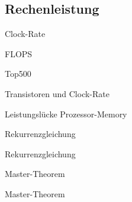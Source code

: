 \subsection{Rechenleistung}

\begin{defi}{Clock-Rate}

\end{defi}

\begin{defi}{FLOPS}

\end{defi}

\begin{bonus}{Top500}

\end{bonus}

\begin{bonus}{Transistoren und Clock-Rate}

\end{bonus}

\begin{bonus}{Leistungslücke Prozessor-Memory}

\end{bonus}

\begin{defi}{Rekurrenzgleichung}

\end{defi}

\begin{example}{Rekurrenzgleichung}

\end{example}

\begin{defi}{Master-Theorem}

\end{defi}

\begin{example}{Master-Theorem}

\end{example}


